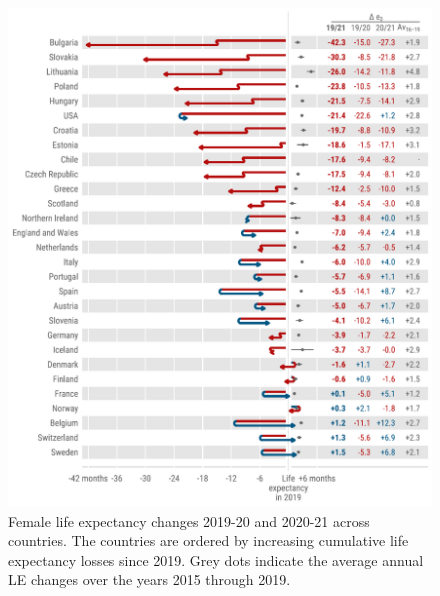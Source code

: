 \documentclass[12pt]{article}
\begin{document}
\begin{figure}[hb!]
    \centering
    \includegraphics{50-e0diffF.pdf}
    \caption{Female life expectancy changes 2019-20 and 2020-21 across countries. The countries are ordered by increasing cumulative life expectancy losses since 2019. Grey dots indicate the average annual LE changes over the years 2015 through 2019.}
    \label{fig:de0F}
\end{figure}
\end{document}
